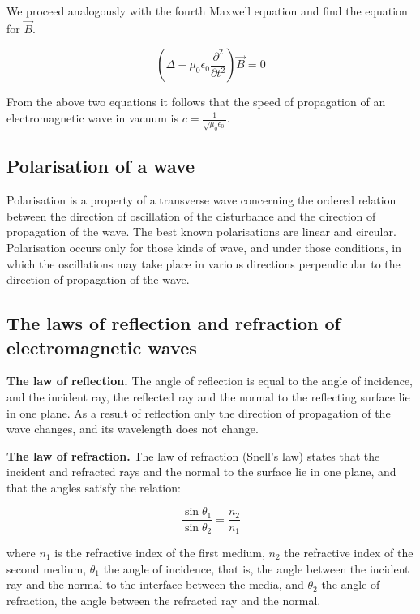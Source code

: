 We proceed analogously with the fourth Maxwell equation and find the equation for $\vec{B}$.

\begin{equation}
    \left(\Delta - \mu_{0}\epsilon_{0}\frac{\partial^{2}}{\partial t^{2}}\right)\vec{B} = 0
\end{equation}

From the above two equations it follows that the speed of propagation of an electromagnetic wave in vacuum is $c = \frac{1}{\sqrt{\mu_{0}\epsilon_{0}}}$.

\subsection{Polarisation of a wave}

Polarisation is a property of a transverse wave concerning the ordered relation between the direction of oscillation of the disturbance and the direction of propagation of the wave. The best known polarisations are linear and circular. Polarisation occurs only for those kinds of wave, and under those conditions, in which the oscillations may take place in various directions perpendicular to the direction of propagation of the wave.

\subsection{The laws of reflection and refraction of electromagnetic waves}

\textbf{The law of reflection.} The angle of reflection is equal to the angle of incidence, and the incident ray, the reflected ray and the normal to the reflecting surface lie in one plane. As a result of reflection only the direction of propagation of the wave changes, and its wavelength does not change.

\textbf{The law of refraction.} The law of refraction (Snell's law) states that the incident and refracted rays and the normal to the surface lie in one plane, and that the angles satisfy the relation:

\begin{equation}
    \frac{\sin{\theta_{1}}}{\sin{\theta_{2}}} = \frac{n_{2}}{n_{1}}
\end{equation}

where $n_{1}$ is the refractive index of the first medium, $n_{2}$ the refractive index of the second medium, $\theta_{1}$ the angle of incidence, that is, the angle between the incident ray and the normal to the interface between the media, and $\theta_{2}$ the angle of refraction, the angle between the refracted ray and the normal.


